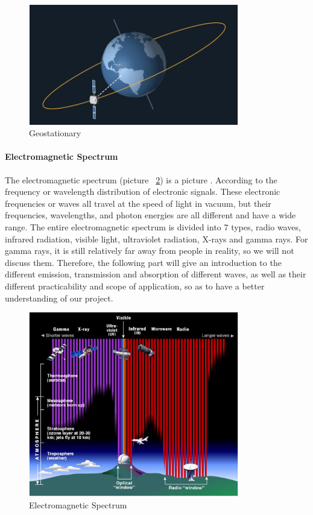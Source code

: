 \documentclass[conference]{IEEEtran}
\begin{document}
\begin{figure}[htbp]
    \centerline{\includegraphics[width=260pt]{images/1.1.3.png}}
    \caption{Geostationary}
    \label{Geostationary}
\end{figure}

\paragraph{Electromagnetic Spectrum} 
The electromagnetic spectrum (picture ~\ref{Spectrum}) is a picture \cite{electrom75:online}. According to the frequency or wavelength distribution of electronic signals. These electronic frequencies or waves all travel at the speed of light in vacuum, but their frequencies, wavelengths, and photon energies are all different and have a wide range. The entire electromagnetic spectrum is divided into 7 types, radio waves, infrared radiation, visible light, ultraviolet radiation, X-rays and gamma rays. For gamma rays, it is still relatively far away from people in reality, so we will not discuss them. Therefore, the following part will give an introduction to the different emission, transmission and absorption of different waves, as well as their different practicability and scope of application, so as to have a better understanding of our project.

\begin{figure}[htbp]
    \centerline{\includegraphics[width=260pt]{images/1.2.png}}
    \caption{Electromagnetic Spectrum}
    \label{Spectrum}
\end{figure}
\end{document}
